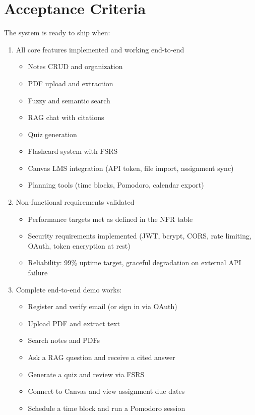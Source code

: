 \documentclass[12pt,a4paper]{article}
\begin{document}
\section{Acceptance Criteria}

The system is ready to ship when:

\begin{enumerate}
    \item All core features implemented and working end-to-end
    \begin{itemize}
        \item Notes CRUD and organization
        \item PDF upload and extraction
        \item Fuzzy and semantic search
        \item RAG chat with citations
        \item Quiz generation
        \item Flashcard system with FSRS
        \item Canvas LMS integration (API token, file import, assignment sync)
        \item Planning tools (time blocks, Pomodoro, calendar export)
    \end{itemize}

    \item Non-functional requirements validated
    \begin{itemize}
        \item Performance targets met as defined in the NFR table
        \item Security requirements implemented (JWT, bcrypt, CORS, rate limiting, OAuth, token encryption at rest)
        \item Reliability: 99\% uptime target, graceful degradation on external API failure
    \end{itemize}

    \item Complete end-to-end demo works:
    \begin{itemize}
        \item Register and verify email (or sign in via OAuth)
        \item Upload PDF and extract text
        \item Search notes and PDFs
        \item Ask a RAG question and receive a cited answer
        \item Generate a quiz and review via FSRS
        \item Connect to Canvas and view assignment due dates
        \item Schedule a time block and run a Pomodoro session
    \end{itemize}


\end{enumerate}
\end{document}
